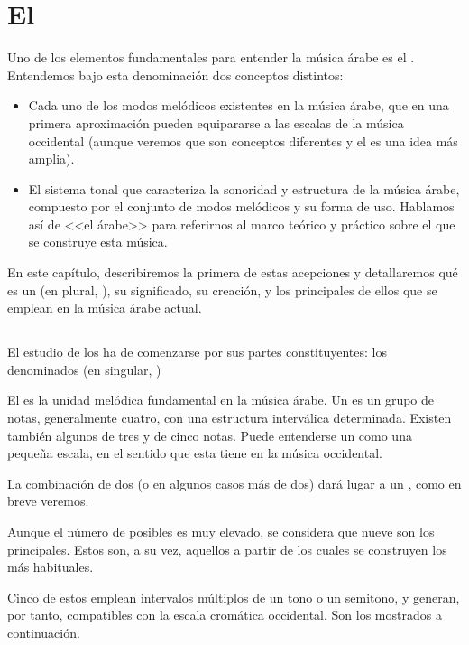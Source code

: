 \chapter{El \maqam}
\label{maqam}

\pagestyle{fancyplain}
Uno de los elementos fundamentales para entender la música árabe es el \maqamb. Entendemos bajo esta denominación dos conceptos distintos:

\begin{itemize}
\item Cada uno de los modos melódicos existentes en la música árabe, que en una primera aproximación pueden equipararse a las escalas de la música occidental (aunque veremos que son conceptos diferentes y el \maqam es una idea más amplia).
\item El sistema tonal que caracteriza la sonoridad y estructura de la música árabe, compuesto por el conjunto de modos melódicos y su forma de uso. Hablamos así de <<el \maqam árabe>> para referirnos al marco teórico y práctico sobre el que se construye esta música.
\end{itemize}

En este capítulo, describiremos la primera de estas acepciones y detallaremos qué es un \maqam (en plural, \maqamaatb), su significado, su creación, y los principales de ellos que se emplean en la música árabe actual.

\section{\Yins}

El estudio de los \maqam ha de comenzarse por sus partes constituyentes: los denominados \ashnas (en singular, \yinsb)

El \yins es la unidad melódica fundamental en la música árabe. Un \yins es un grupo de notas, generalmente cuatro, con una estructura interválica determinada. Existen también algunos \ashnas de tres y de cinco notas. Puede entenderse un \yins como una pequeña escala, en el sentido que esta tiene en la música occidental.

La combinación de dos \ashnas (o en algunos casos más de dos) dará lugar a un \maqamb, como en breve veremos.

Aunque el número de \ashnas posibles es muy elevado, se considera que nueve son los principales. Estos son, a su vez, aquellos a partir de los cuales se construyen los \maqamaat más habituales.

Cinco de estos \ashnas emplean intervalos múltiplos de un tono o un semitono, y generan, por tanto, \maqamaat compatibles con la escala cromática occidental. Son los mostrados a continuación.

